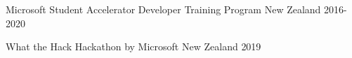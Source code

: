 

\begin{cvhonors}

  \cvhonor
    {Microsoft Student Accelerator} %
    {Developer Training Program} %
    {New Zealand} %
    {2016-2020} %

  \cvhonor
    {What the Hack} %
    {Hackathon by Microsoft} %
    {New Zealand} %
    {2019} %

\end{cvhonors}
